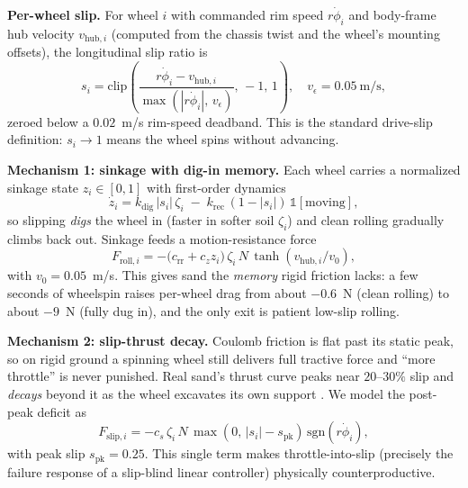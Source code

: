 \documentclass[conference]{IEEEtran}
\begin{document}
\vspace{1mm}
\noindent\textbf{Per-wheel slip.} For wheel $i$ with commanded rim speed $r\dot{\phi}_i$ and body-frame hub velocity $v_{\text{hub},i}$ (computed from the chassis twist and the wheel's mounting offsets), the longitudinal slip ratio is
\begin{equation}
s_i = \mathrm{clip}\!\left(\frac{r\dot{\phi}_i - v_{\text{hub},i}}{\max(|r\dot{\phi}_i|,\, v_\epsilon)},\, -1,\, 1\right), \quad v_\epsilon = 0.05~\text{m/s},
\end{equation}
zeroed below a $0.02$~m/s rim-speed deadband. This is the standard drive-slip definition: $s_i \rightarrow 1$ means the wheel spins without advancing.

\vspace{1mm}
\noindent\textbf{Mechanism 1: sinkage with dig-in memory.} Each wheel carries a normalized sinkage state $z_i \in [0,1]$ with first-order dynamics
\begin{equation}
\dot{z}_i = k_{\text{dig}}\, |s_i|\, \zeta_i \;-\; k_{\text{rec}}\, (1 - |s_i|)\,\mathbb{1}[\text{moving}],
\end{equation}
so slipping \emph{digs} the wheel in (faster in softer soil $\zeta_i$) and clean rolling gradually climbs back out. Sinkage feeds a motion-resistance force
\begin{equation}
F_{\text{roll},i} = -\big(c_{\text{rr}} + c_{z} z_i\big)\, \zeta_i\, N\, \tanh(v_{\text{hub},i}/v_0),
\end{equation}
with $v_0 = 0.05$~m/s. This gives sand the \emph{memory} rigid friction lacks: a few seconds of wheelspin raises per-wheel drag from about $-0.6$~N (clean rolling) to about $-9$~N (fully dug in), and the only exit is patient low-slip rolling.

\vspace{1mm}
\noindent\textbf{Mechanism 2: slip-thrust decay.} Coulomb friction is flat past its static peak, so on rigid ground a spinning wheel still delivers full tractive force and ``more throttle'' is never punished. Real sand's thrust curve peaks near $20$--$30\%$ slip and \emph{decays} beyond it as the wheel excavates its own support \cite{wong2008theory, ishigami2007terramechanics}. We model the post-peak deficit as
\begin{equation}
F_{\text{slip},i} = -c_{s}\, \zeta_i\, N\, \max(0,\, |s_i| - s_{\text{pk}})\,\mathrm{sgn}(r\dot{\phi}_i),
\end{equation}
with peak slip $s_{\text{pk}} = 0.25$. This single term makes throttle-into-slip (precisely the failure response of a slip-blind linear controller) physically counterproductive.
\end{document}
